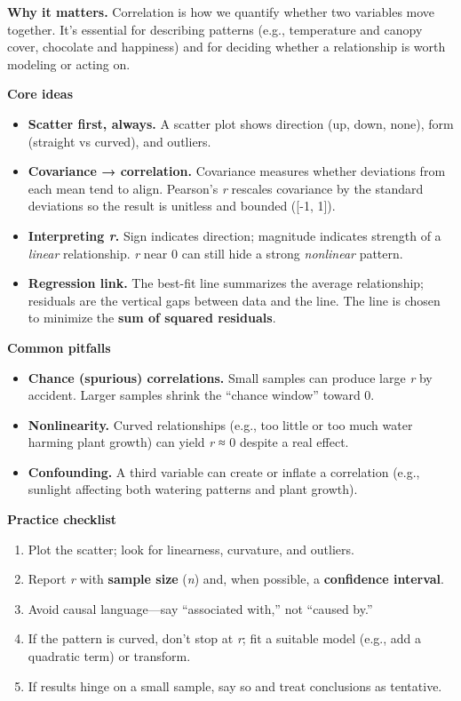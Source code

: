 \documentclass[
  letterpaper,
  DIV=11,
  numbers=noendperiod]{scrreprt}
\providecommand{\tightlist}{%
  \setlength{\itemsep}{0pt}\setlength{\parskip}{0pt}}
\begin{document}
\textbf{Why it matters.} Correlation is how we quantify whether two
variables move together. It's essential for describing patterns (e.g.,
temperature and canopy cover, chocolate and happiness) and for deciding
whether a relationship is worth modeling or acting on.

\textbf{Core ideas}

\begin{itemize}
\tightlist
\item
  \textbf{Scatter first, always.} A scatter plot shows direction (up,
  down, none), form (straight vs curved), and outliers.
\item
  \textbf{Covariance → correlation.} Covariance measures whether
  deviations from each mean tend to align. Pearson's \emph{r} rescales
  covariance by the standard deviations so the result is unitless and
  bounded ({[}-1, 1{]}).
\item
  \textbf{Interpreting \emph{r}.} Sign indicates direction; magnitude
  indicates strength of a \emph{linear} relationship. \emph{r} near 0
  can still hide a strong \emph{nonlinear} pattern.
\item
  \textbf{Regression link.} The best-fit line summarizes the average
  relationship; residuals are the vertical gaps between data and the
  line. The line is chosen to minimize the \textbf{sum of squared
  residuals}.
\end{itemize}

\textbf{Common pitfalls}

\begin{itemize}
\tightlist
\item
  \textbf{Chance (spurious) correlations.} Small samples can produce
  large \textbar{}\emph{r}\textbar{} by accident. Larger samples shrink
  the ``chance window'' toward 0.
\item
  \textbf{Nonlinearity.} Curved relationships (e.g., too little or too
  much water harming plant growth) can yield \emph{r} ≈ 0 despite a real
  effect.
\item
  \textbf{Confounding.} A third variable can create or inflate a
  correlation (e.g., sunlight affecting both watering patterns and plant
  growth).
\end{itemize}

\textbf{Practice checklist}

\begin{enumerate}
\def\labelenumi{\arabic{enumi}.}
\tightlist
\item
  Plot the scatter; look for linearness, curvature, and outliers.\\
\item
  Report \emph{r} with \textbf{sample size} (\emph{n}) and, when
  possible, a \textbf{confidence interval}.
\item
  Avoid causal language---say ``associated with,'' not ``caused by.''\\
\item
  If the pattern is curved, don't stop at \emph{r}; fit a suitable model
  (e.g., add a quadratic term) or transform.\\
\item
  If results hinge on a small sample, say so and treat conclusions as
  tentative.
\end{enumerate}
\end{document}

